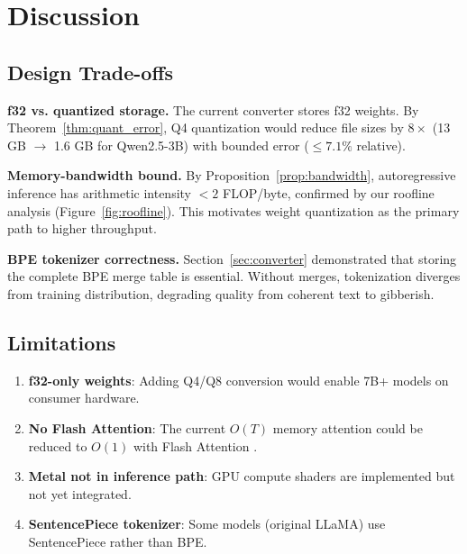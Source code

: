 \documentclass[12pt,a4paper]{article}
\begin{document}
\section{Discussion}
\label{sec:discussion}

\subsection{Design Trade-offs}

\textbf{f32 vs. quantized storage.} The current converter stores f32 weights. By Theorem~\ref{thm:quant_error}, Q4 quantization would reduce file sizes by $8\times$ (13 GB $\to$ 1.6 GB for Qwen2.5-3B) with bounded error ($\leq 7.1\%$ relative).

\textbf{Memory-bandwidth bound.} By Proposition~\ref{prop:bandwidth}, autoregressive inference has arithmetic intensity $<2$ FLOP/byte, confirmed by our roofline analysis (Figure~\ref{fig:roofline}). This motivates weight quantization as the primary path to higher throughput.

\textbf{BPE tokenizer correctness.} Section~\ref{sec:converter} demonstrated that storing the complete BPE merge table is essential. Without merges, tokenization diverges from training distribution, degrading quality from coherent text to gibberish.

\subsection{Limitations}

\begin{enumerate}[leftmargin=*]
    \item \textbf{f32-only weights}: Adding Q4/Q8 conversion would enable 7B+ models on consumer hardware.
    \item \textbf{No Flash Attention}: The current $O(T)$ memory attention could be reduced to $O(1)$ with Flash Attention \citep{dao2022flashattention}.
    \item \textbf{Metal not in inference path}: GPU compute shaders are implemented but not yet integrated.
    \item \textbf{SentencePiece tokenizer}: Some models (original LLaMA) use SentencePiece rather than BPE.
\end{enumerate}

\end{document}
